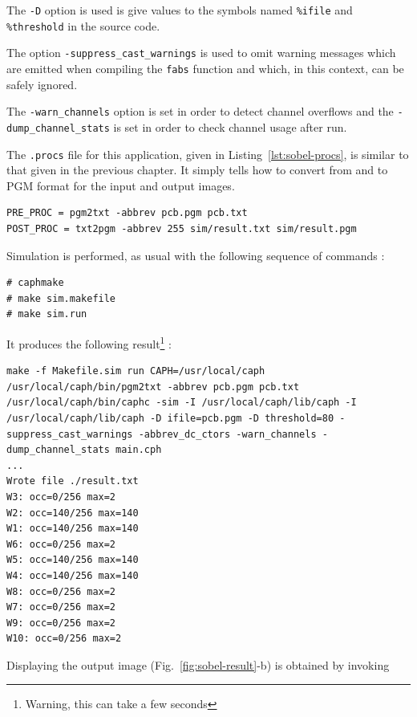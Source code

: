 The \verb|-D| option is used is give values to the symbols named \verb|%ifile| and \verb|%threshold|
in the source code. 

The option \verb|-suppress_cast_warnings| is used to omit warning messages
which are emitted when compiling the \verb|fabs| function and which, in this context, can be safely
ignored.

The \verb|-warn_channels| option is set in order to detect channel overflows and the
\verb|-dump_channel_stats| is set in order to check channel usage after run. 

\medskip The \verb|.procs| file for this application, given in Listing~\ref{lst:sobel-procs}, is
similar to that given in the previous chapter. It simply tells how to convert from and to PGM format
for the input and output images.

\begin{lstlisting}[style=MakeStyle,caption={File
    \texttt{sobel.procs} for the \texttt{sobel} program of
    Listing~\ref{lst:sobel-full}},label={lst:sobel-procs}]
PRE_PROC = pgm2txt -abbrev pcb.pgm pcb.txt
POST_PROC = txt2pgm -abbrev 255 sim/result.txt sim/result.pgm
\end{lstlisting}

\medskip
Simulation is performed, as usual with the following sequence of commands :

\begin{lstlisting}[style=BashInputStyle]
# caphmake
# make sim.makefile
# make sim.run
\end{lstlisting}

It produces the following result\footnote{Warning, this can take a few seconds} :

\begin{lstlisting}[style=BashOutputStyle]
make -f Makefile.sim run CAPH=/usr/local/caph
/usr/local/caph/bin/pgm2txt -abbrev pcb.pgm pcb.txt
/usr/local/caph/bin/caphc -sim -I /usr/local/caph/lib/caph -I /usr/local/caph/lib/caph -D ifile=pcb.pgm -D threshold=80 -suppress_cast_warnings -abbrev_dc_ctors -warn_channels -dump_channel_stats main.cph
...
Wrote file ./result.txt
W3: occ=0/256 max=2
W2: occ=140/256 max=140
W1: occ=140/256 max=140
W6: occ=0/256 max=2
W5: occ=140/256 max=140
W4: occ=140/256 max=140
W8: occ=0/256 max=2
W7: occ=0/256 max=2
W9: occ=0/256 max=2
W10: occ=0/256 max=2
\end{lstlisting}

Displaying the output image (Fig.~\ref{fig:sobel-result}-b) is obtained by invoking

